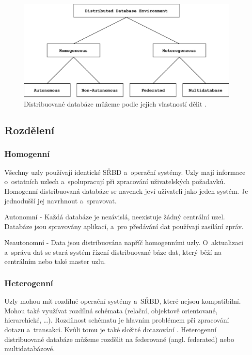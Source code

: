 \begin{figure}[!h]
  \centering
  \includegraphics[width=14.2cm]{template-fig/DistributedDatabasesClassification.pdf}
  \caption{Distribuované databáze můžeme podle jejich vlastností dělit \cite{distributedDBMS}.}
  \label{FIG_DivDistrDB}
\end{figure}

\subsection{Rozdělení}
\subsubsection{Homogenní}
Všechny uzly používají identické SŘBD a~operační systémy. Uzly mají informace o~ostatních uzlech a~spolupracují při zpracování uživatelských požadavků. Homogenní distribuovaná databáze se navenek jeví uživateli jako jeden systém. Je jednodušší jej navrhnout a~spravovat.

\vspace{0.5cm}
\noindent Autonomní - Každá databáze je nezávislá, neexistuje žádný centrální uzel. Databáze jsou spravovány aplikací, a~pro předávání dat používají zasílání zpráv.

\vspace{0.5cm}
\noindent Neautonomní - Data jsou distribuována napříč homogenními uzly. O~aktualizaci a~správu dat se stará systém řízení distribuované báze dat, který běží na centrálním nebo také master uzlu.

\subsubsection{Heterogenní}
Uzly mohou mít rozdílné operační systémy a~SŘBD, které nejsou kompatibilní. Mohou také využívat rozdílná schémata (relační, objektově orientované, hierarchické, \ldots). Rozdílnost schématu je hlavním problémem při zpracování dotazu a~transakcí. Kvůli tomu je také složité dotazování \cite{wikiDBMS}. Heterogenní distribuované databáze můžeme rozdělit na federované (angl. federated) nebo multidatabázové.

